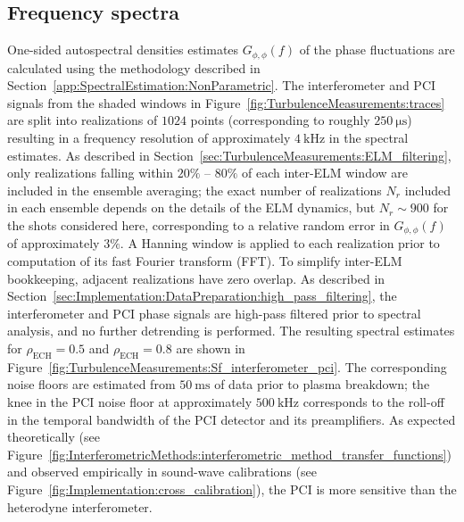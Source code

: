 \subsection{Frequency spectra}
\label{sec:TurbulenceMeasurements:Sf}
One-sided autospectral densities estimates $G_{\phi,\phi}(f)$
of the phase fluctuations
are calculated using the methodology
described in Section~\ref{app:SpectralEstimation:NonParametric}.
The interferometer and PCI signals
from the shaded windows in
Figure~\ref{fig:TurbulenceMeasurements:traces}
are split into realizations of $1024$ points
(corresponding to roughly $\SI{250}{\micro\second}$)
resulting in a frequency resolution
of approximately $\SI{4}{\kilo\hertz}$ in the spectral estimates.
As described in Section~\ref{sec:TurbulenceMeasurements:ELM_filtering},
only realizations falling within
$20\%$ -- $80\%$ of each inter-ELM window
are included in the ensemble averaging;
the exact number of realizations $N_r$
included in each ensemble
depends on the details of the ELM dynamics, but
$N_r \sim 900$ for the shots considered here,
corresponding to a relative random error
in $G_{\phi,\phi}(f)$ of approximately $3\%$.
A Hanning window is applied to each realization
prior to computation of its fast Fourier transform (FFT).
To simplify inter-ELM bookkeeping,
adjacent realizations have zero overlap.
As described in
Section~\ref{sec:Implementation:DataPreparation:high_pass_filtering},
the interferometer and PCI phase signals
are high-pass filtered prior to spectral analysis, and
no further detrending is performed.
The resulting spectral estimates
for $\rho_{\text{ECH}} = 0.5$ and $\rho_{\text{ECH}} = 0.8$
are shown in
Figure~\ref{fig:TurbulenceMeasurements:Sf_interferometer_pci}.
The corresponding noise floors are estimated
from $\SI{50}{\milli\second}$ of data
prior to plasma breakdown;
the knee in the PCI noise floor
at approximately $\SI{500}{\kilo\hertz}$
corresponds to the roll-off in the temporal bandwidth
of the PCI detector and its preamplifiers.
As expected theoretically
(see Figure~\ref{fig:InterferometricMethods:interferometric_method_transfer_functions})
and observed empirically in sound-wave calibrations
(see Figure~\ref{fig:Implementation:cross_calibration}),
the PCI is more sensitive than the heterodyne interferometer.

